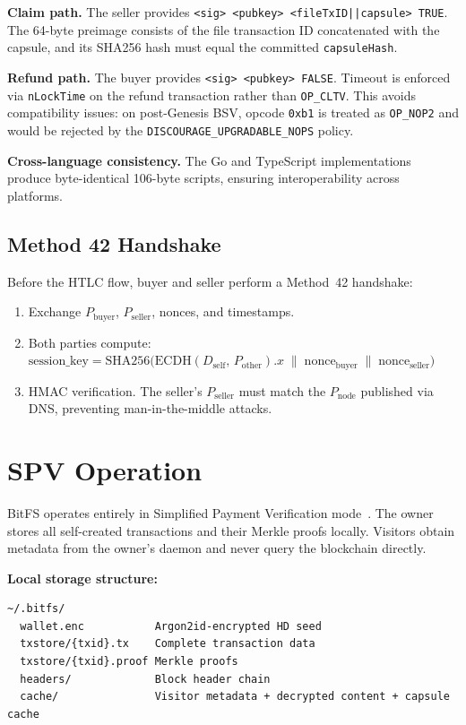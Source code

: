 \documentclass[11pt,a4paper]{article}
\begin{document}
\textbf{Claim path.} The seller provides \texttt{<sig> <pubkey> <fileTxID||capsule> TRUE}. The 64-byte preimage consists of the file transaction ID concatenated with the capsule, and its SHA256 hash must equal the committed \texttt{capsuleHash}.

\textbf{Refund path.} The buyer provides \texttt{<sig> <pubkey> FALSE}. Timeout is enforced via \texttt{nLockTime} on the refund transaction rather than \texttt{OP\_CLTV}. This avoids compatibility issues: on post-Genesis BSV, opcode \texttt{0xb1} is treated as \texttt{OP\_NOP2} and would be rejected by the \texttt{DISCOURAGE\_UPGRADABLE\_NOPS} policy.

\textbf{Cross-language consistency.} The Go and TypeScript implementations produce byte-identical 106-byte scripts, ensuring interoperability across platforms.

\subsection{Method 42 Handshake}

Before the HTLC flow, buyer and seller perform a Method~42 handshake:

\begin{enumerate}
\item Exchange $P_{\text{buyer}}$, $P_{\text{seller}}$, nonces, and timestamps.
\item Both parties compute: $\text{session\_key} = \text{SHA256}\!\bigl(\text{ECDH}(D_{\text{self}},\, P_{\text{other}}).x \;\|\; \text{nonce}_{\text{buyer}} \;\|\; \text{nonce}_{\text{seller}}\bigr)$
\item HMAC verification. The seller's $P_{\text{seller}}$ must match the $P_{\text{node}}$ published via DNS, preventing man-in-the-middle attacks.
\end{enumerate}

\section{SPV Operation}

BitFS operates entirely in Simplified Payment Verification mode~\cite{spv}. The owner stores all self-created transactions and their Merkle proofs locally. Visitors obtain metadata from the owner's daemon and never query the blockchain directly.

\textbf{Local storage structure:}

\begin{lstlisting}
~/.bitfs/
  wallet.enc           Argon2id-encrypted HD seed
  txstore/{txid}.tx    Complete transaction data
  txstore/{txid}.proof Merkle proofs
  headers/             Block header chain
  cache/               Visitor metadata + decrypted content + capsule cache
\end{lstlisting}
\end{document}
